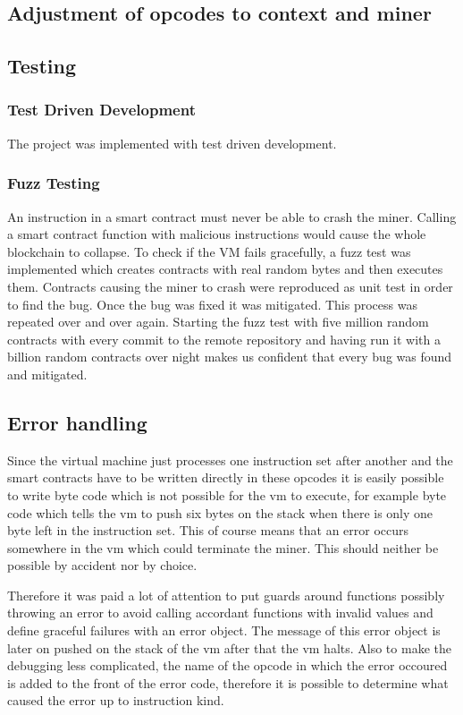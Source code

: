 \subsection{Adjustment of opcodes to context and miner}

\subsection{Testing}
\subsubsection{Test Driven Development}
The project was implemented with test driven development. 

\subsubsection{Fuzz Testing}
An instruction in a smart contract must never be able to crash the miner. Calling a smart contract function with malicious instructions would cause the whole blockchain to collapse. To check if the VM fails gracefully, a fuzz test was implemented which creates contracts with real random bytes and then executes them. Contracts causing the miner to crash were reproduced as unit test in order to find the bug. Once the bug was fixed it was mitigated. This process was repeated over and over again. Starting the fuzz test with five million random contracts with every commit to the remote repository and having run it with a billion random contracts over night makes us confident that every bug was found and mitigated.

\subsection{Error handling}
Since the virtual machine just processes one instruction set after another and the smart contracts have to be written directly in these opcodes it is easily possible to write byte code which is not possible for the vm to execute, for example byte code which tells the vm to push six bytes on the stack when there is only one byte left in the instruction set. This of course means that an error occurs somewhere in the vm which could terminate the miner. This should neither be possible by accident nor by choice.

Therefore it was paid a lot of attention to put guards around functions possibly throwing an error to avoid calling accordant functions with invalid values and define graceful failures with an error object. The message of this error object is later on pushed on the stack of the vm after that the vm halts. Also to make the debugging less complicated, the name of the opcode in which the error occoured is added to the front of the error code, therefore it is possible to determine what caused the error up to instruction kind.

